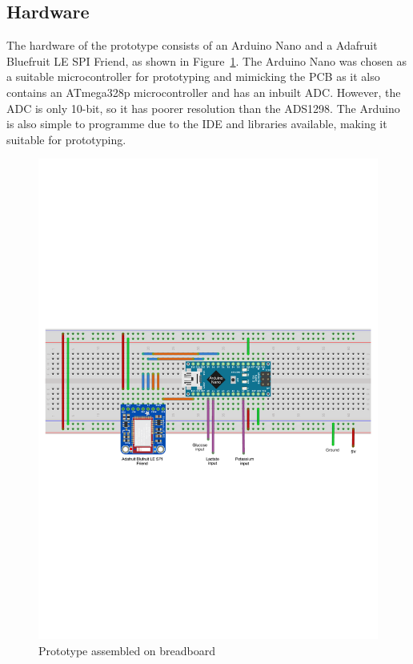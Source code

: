 \subsection{Hardware}
The hardware of the prototype consists of an Arduino Nano and a Adafruit Bluefruit LE SPI Friend, as shown in Figure~\ref{fig: breadboard}. The Arduino Nano was chosen as a suitable microcontroller for prototyping and mimicking the PCB as it also contains an ATmega328p microcontroller and has an inbuilt ADC. However, the ADC is only 10-bit, so it has poorer resolution than the ADS1298. The Arduino is also simple to programme due to the IDE and libraries available, making it suitable for prototyping.

\begin{figure}[H]
\centering
\includegraphics[trim={0cm 10.5cm 0cm  10cm}, clip, width=1\textwidth]{./figures/Breadboard2.pdf}
\captionsetup{justification=centering}
\caption{Prototype assembled on breadboard}
\label{fig: breadboard}
\end{figure}

